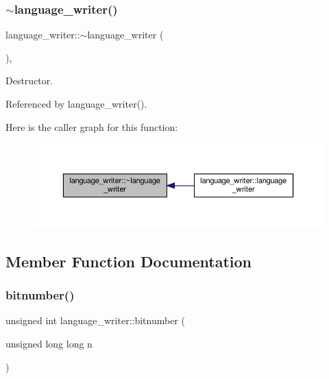 \subsubsection{\texorpdfstring{$\sim$language\+\_\+writer()}{~language\_writer()}}
{\footnotesize\ttfamily language\+\_\+writer\+::$\sim$language\+\_\+writer (\begin{DoxyParamCaption}{ }\end{DoxyParamCaption})\hspace{0.3cm}{\ttfamily [virtual]}, {\ttfamily [default]}}



Destructor. 



Referenced by language\+\_\+writer().

Here is the caller graph for this function\+:
\nopagebreak
\begin{figure}[H]
\begin{center}
\leavevmode
\includegraphics[width=350pt]{d6/d67/classlanguage__writer_ae8acf0e28cb5fcd69ef12a32dc019232_icgraph}
\end{center}
\end{figure}


\subsection{Member Function Documentation}
\mbox{\label{classlanguage__writer_a966840e95ec2f66d5128d6cbc54b89bb}} 
\subsubsection{\texorpdfstring{bitnumber()}{bitnumber()}}
{\footnotesize\ttfamily unsigned int language\+\_\+writer\+::bitnumber (\begin{DoxyParamCaption}\item[{unsigned long long}]{n }\end{DoxyParamCaption})\hspace{0.3cm}{\ttfamily [static]}}



